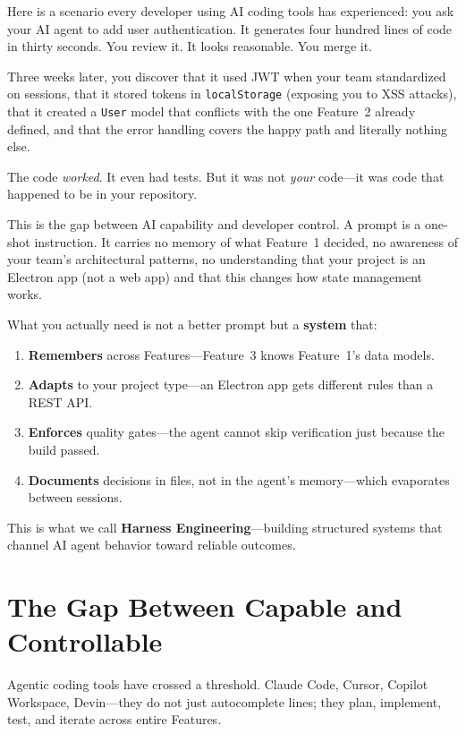 \documentclass[11pt,a4paper,openright,twoside]{report}
\begin{document}
Here is a scenario every developer using AI coding tools has experienced: you ask your AI agent to add user authentication. It generates four hundred lines of code in thirty seconds. You review it. It looks reasonable. You merge it.

Three weeks later, you discover that it used JWT when your team standardized on sessions, that it stored tokens in \texttt{localStorage} (exposing you to XSS attacks), that it created a \texttt{User} model that conflicts with the one Feature~2 already defined, and that the error handling covers the happy path and literally nothing else.

The code \emph{worked}. It even had tests. But it was not \emph{your} code---it was code that happened to be in your repository.

This is the gap between AI capability and developer control. A prompt is a one-shot instruction. It carries no memory of what Feature~1 decided, no awareness of your team's architectural patterns, no understanding that your project is an Electron app (not a web app) and that this changes how state management works.

What you actually need is not a better prompt but a \textbf{system} that:

\begin{enumerate}
  \item \textbf{Remembers} across Features---Feature~3 knows Feature~1's data models.
  \item \textbf{Adapts} to your project type---an Electron app gets different rules than a REST API.
  \item \textbf{Enforces} quality gates---the agent cannot skip verification just because the build passed.
  \item \textbf{Documents} decisions in files, not in the agent's memory---which evaporates between sessions.
\end{enumerate}

This is what we call \textbf{Harness Engineering}---building structured systems that channel AI agent behavior toward reliable outcomes.

\section{The Gap Between Capable and Controllable}

Agentic coding tools have crossed a threshold. Claude Code, Cursor, Copilot Workspace, Devin---they do not just autocomplete lines; they plan, implement, test, and iterate across entire Features.
\end{document}

